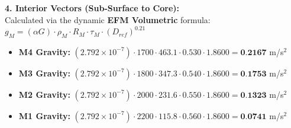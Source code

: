 \documentclass[11pt, a4paper]{article}
\begin{document}
  \vspace{0.5em}
  \noindent \textbf{4. Interior Vectors (Sub-Surface to Core):} \\[0.5em]
  \hspace*{1em} Calculated via the dynamic \textbf{EFM Volumetric} formula: $g_M = (\alpha G) \cdot \rho_{M} \cdot R_M \cdot \tau_M \cdot (D_{ref})^{0.21}$
  \begin{itemize}
    \item \textbf{M4 Gravity:} $(2.792 \times 10^{-7}) \cdot 1700 \cdot 463.1 \cdot 0.530 \cdot 1.8600 = \textbf{0.2167}$ m/s$^2$
    \item \textbf{M3 Gravity:} $(2.792 \times 10^{-7}) \cdot 1800 \cdot 347.3 \cdot 0.540 \cdot 1.8600 = \textbf{0.1753}$ m/s$^2$
    \item \textbf{M2 Gravity:} $(2.792 \times 10^{-7}) \cdot 2000 \cdot 231.6 \cdot 0.550 \cdot 1.8600 = \textbf{0.1323}$ m/s$^2$
    \item \textbf{M1 Gravity:} $(2.792 \times 10^{-7}) \cdot 2200 \cdot 115.8 \cdot 0.560 \cdot 1.8600 = \textbf{0.0741}$ m/s$^2$
  \end{itemize}
\end{document}
